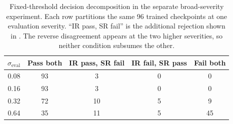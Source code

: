 \begin{table}[!htb]
\centering
\caption{Fixed-threshold decision decomposition in the separate
broad-severity experiment. Each row partitions the same 96 trained checkpoints
at one evaluation severity. ``IR pass, SR fail'' is the additional rejection
shown in . The reverse disagreement appears at
the two higher severities, so neither condition subsumes the other.}
\label{tab:multiseverity-decision-decomposition}
\small
\begin{tabular}{ccccc}
\toprule
$\sigma_{\mathrm{eval}}$ & Pass both & IR pass, SR fail & IR fail, SR pass & Fail both \\
\midrule
0.08 & 93 & 3 & 0 & 0 \\
0.16 & 93 & 3 & 0 & 0 \\
0.32 & 72 & 10 & 5 & 9 \\
0.64 & 35 & 11 & 5 & 45 \\
\bottomrule
\end{tabular}
\end{table}

